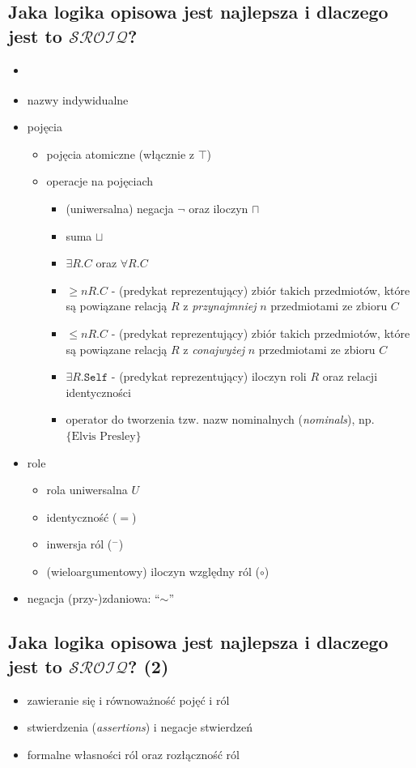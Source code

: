 \documentclass[12pt]{article}
\begin{document}
\subsection[shrink=0.8]{Jaka logika opisowa jest najlepsza i dlaczego jest to $\mathcal{SROIQ}$?}
%
\begin{itemize}
\item \cite{conf/kr/HorrocksKS06}
%
\item nazwy indywidualne
%
\item pojęcia
\begin{itemize}
\item pojęcia atomiczne (włącznie z $\top$)
%
\item operacje na pojęciach
\begin{itemize}
\item (uniwersalna) negacja $\neg$ oraz iloczyn $\sqcap$
\item suma $\sqcup$
\item $\exists R. C$ oraz $\forall R.C$
\item $\geq n R . C$ - (predykat reprezentujący) zbiór takich przedmiotów, które są powiązane relacją $R$ z \emph{przynajmniej} $n$ przedmiotami ze zbioru $C$
\item $\leq n R . C$ - (predykat reprezentujący) zbiór takich przedmiotów, które są powiązane relacją $R$ z \emph{conajwyżej} $n$ przedmiotami ze zbioru $C$
\item $\exists R.\texttt{Self}$ - (predykat reprezentujący) iloczyn roli $R$ oraz relacji identyczności
\item operator do tworzenia tzw. nazw nominalnych (\emph{nominals}), np. $\{\text{Elvis Presley}\}$ 
\end{itemize}
\end{itemize}
%
\item role
\begin{itemize}
\item rola uniwersalna $U$
\item identyczność ($=$)
\item inwersja ról ($^{-}$)
\item (wieloargumentowy) iloczyn względny ról ($\circ$)
\end{itemize}
%
\item negacja (przy-)zdaniowa: ``$\sim$''
\end{itemize}
%

\subsection{Jaka logika opisowa jest najlepsza i dlaczego jest to $\mathcal{SROIQ}$? (2)}
%
\begin{itemize}
\item zawieranie się i równoważność pojęć i ról
\item stwierdzenia (\emph{assertions}) i negacje stwierdzeń
\item formalne własności ról oraz rozłączność ról
\end{itemize}
%
\end{document}
